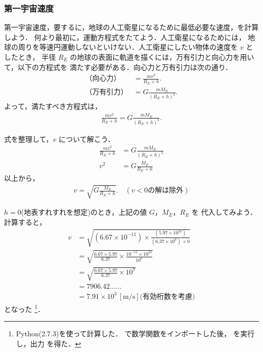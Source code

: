         \subsubsection{第一宇宙速度}
            第一宇宙速度，要するに，地球の人工衛星になるために最低必要な速度，を計算しよう．
            何より最初に，運動方程式をたてよう．人工衛星になるためには，
            地球の周りを等速円運動しないといけない．人工衛星にしたい物体の速度を $v$ としたとき，
            半径 $R_{E}$ の地球の表面に軌道を描くには，万有引力と向心力を用いて，以下の方程式を
            満たす必要がある．向心力と万有引力は次の通り．
            \begin{align*}
                \mbox{（向心力）}   &= \frac{mv^{2}}{R_{E}+h}. \\
                \mbox{（万有引力）} &= G\frac{mM_{E}}{(R_{E}+h)^{2}}.
            \end{align*}
            よって，満たすべき方程式は，
            \begin{align}
                \frac{mv^{2}}{R_{E}+h} = G\frac{mM_{E}}{(R_{E}+h)^{2}}.
            \end{align}

            式を整理して，$v$ について解こう．
            \begin{align*}
                \frac{mv^{2}}{R_{E}+h} &= G\frac{mM_{E}}{(R_{E}+h)^{2}} \\
                v^{2} &= G\frac{M_{E}}{R_{E}+h}
            \end{align*}
            以上から，
            \begin{align}
                v = \sqrt{G\frac{M_{E}}{R_{E}+h}}. \quad (v<0\mbox{の解は除外})
            \end{align}

            $h=0$(地表すれすれを想定)のとき，上記の値 $G$，$M_{E}$，$R_{E}$ を
            代入してみよう．計算すると，
            \begin{align*}
                v &= \sqrt{(6.67 \times 10^{-11}) \times \frac{(5.97 \times 10^{24})}{(6.37 \times 10^{6})+0}} \\
                  &= \sqrt{\frac{6.67 \times 5.97}{6.37} \times  \frac{10^{-11} \times 10^{24}}{10^6{}}} \\
                  &= \sqrt{\frac{6.67 \times 5.97}{6.37} \times  10^{7}} \\
                  &= 7906.42 ...... \\
                  &= 7.91 \times 10^{3} \,\mathrm{[m/s]} \mbox{(有効桁数を考慮)}
            \end{align*}
            となった
                \footnote{
                    Python(2.7.3)を使って計算した． で数学関数をインポートした後，
                     を実行し，出力 を得た．
                }．

